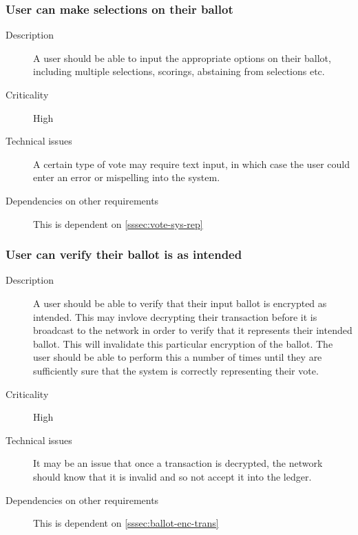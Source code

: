 \documentclass[a4paper,12pt]{article}
\begin{document}
\subsubsection{User can make selections on their ballot}
\begin{description}
	\item[Description]
		A user should be able to input the appropriate options on their ballot, including multiple selections, scorings, abstaining from selections etc.
	\item[Criticality] 
		High
	\item[Technical issues] 
		A certain type of vote may require text input, in which case the user could enter an error or mispelling into the system.
	\item[Dependencies on other requirements]
		This is dependent on \ref{sssec:vote-sys-rep}
\end{description}

\subsubsection{User can verify their ballot is as intended}
\begin{description}
	\item[Description]
		A user should be able to verify that their input ballot is encrypted as intended. This may invlove decrypting their transaction before it is broadcast to the network in order to verify that it represents their intended ballot. This will invalidate this particular encryption of the ballot. The user should be able to perform this a number of times until they are sufficiently sure that the system is correctly representing their vote.
	\item[Criticality]
		High
	\item[Technical issues]
		It may be an issue that once a transaction is decrypted, the network should know that it is invalid and so not accept it into the ledger.
	\item[Dependencies on other requirements]
		This is dependent on \ref{sssec:ballot-enc-trans} 
\end{description}
\end{document}

